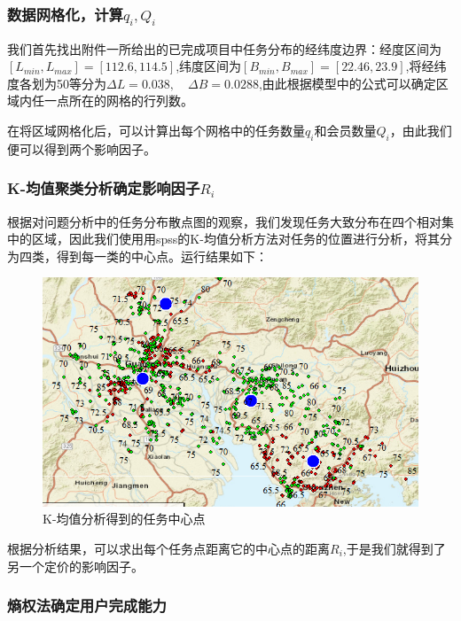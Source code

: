 \documentclass[withoutpreface,bwprint]{cumcmthesis} %
\begin{document}
\subsubsection{数据网格化，计算$q_i,Q_i$}

我们首先找出附件一所给出的已完成项目中任务分布的经纬度边界：经度区间为$[L_{min},L_{max}]=[112.6,114.5]$,纬度区间为$[B_{min},B_{max}]=[22.46,23.9]$,将经纬度各划为50等分为$\Delta L=0.038,\quad \Delta B=0.0288$,由此根据模型中的公式可以确定区域内任一点所在的网格的行列数。

在将区域网格化后，可以计算出每个网格中的任务数量$q_i$和会员数量$Q_i$，由此我们便可以得到两个影响因子。

\subsubsection{K-均值聚类分析确定影响因子$R_i$}

根据对问题分析中的任务分布散点图的观察，我们发现任务大致分布在四个相对集中的区域，因此我们使用用spss的K-均值分析方法对任务的位置进行分析，将其分为四类，得到每一类的中心点。运行结果如下：
\begin{figure}[H]
    \centering
    \includegraphics[width=1\textwidth]{2.png}
    \caption{K-均值分析得到的任务中心点}
    \label{图}
\end{figure}
根据分析结果，可以求出每个任务点距离它的中心点的距离$R_i$,于是我们就得到了另一个定价的影响因子。

\subsubsection{熵权法确定用户完成能力}
\end{document}
